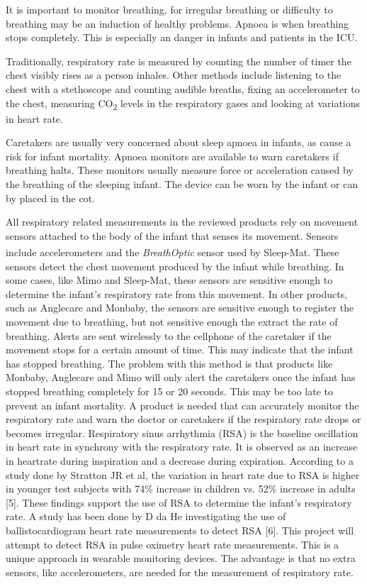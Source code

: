 It is important to monitor breathing, for irregular breathing or difficulty to breathing may be an induction of healthy problems. Apnoea is when breathing stops completely. This is especially an danger in infants and patients in the ICU.

Traditionally, respiratory rate is measured by counting the number of timer the chest visibly rises as a person inhales. Other methods include listening to the chest with a stethoscope and counting audible breaths, fixing an accelerometer to the chest, measuring CO\textsubscript{2} levels in the respiratory gases and looking at variations in heart rate.

Caretakers are usually very concerned about sleep apnoea in infants, as cause a risk for infant mortality. Apnoea monitors are available to warn caretakers if breathing halts. These monitors usually measure force or acceleration caused by the breathing of the sleeping infant. The device can be worn by the infant or can by placed in the cot.


All respiratory related measurements in the reviewed products rely on movement sensors attached to the body of the infant that senses its movement. Sensors include accelerometers and the \textit{BreathOptic}\textsuperscript{\texttrademark} sensor used by Sleep-Mat. These sensors detect the chest movement produced by the infant while breathing. In some cases, like Mimo and Sleep-Mat, these sensors are sensitive enough to determine the infant's respiratory rate from this movement. In other products, such as Anglecare and Monbaby, the sensors are sensitive enough to register the movement due to breathing, but not sensitive enough the extract the rate of breathing.
Alerts are sent wirelessly to the cellphone of the caretaker if the movement stops for a certain amount of time. This may indicate that the infant has stopped breathing. The problem with this method is that products like Monbaby, Anglecare and Mimo will only alert the caretakers once the infant has stopped breathing completely for 15 or 20 seconds. This may be too late to prevent an infant mortality. A product is needed that can accurately monitor the respiratory rate and warn the doctor or caretakers if the respiratory rate drops or becomes irregular.
Respiratory sinus arrhythmia (RSA) is the baseline oscillation in heart rate in synchrony with the respiratory rate. It is observed as an increase in heartrate during inspiration and a decrease during expiration. According to a study done by Stratton JR et al, the variation in heart rate due to RSA is higher in younger test subjects with 74\% increase in children vs. 52\% increase in adults [5]. These findings support the use of RSA to determine the infant's respiratory rate. A study has been done by D da He investigating the use of ballistocardiogram heart rate measurements to detect RSA [6]. This project will attempt to detect RSA in pulse oximetry heart rate measurements. This is a unique approach in wearable monitoring devices. The advantage is that no extra sensors, like accelerometers, are needed for the measurement of respiratory rate.


